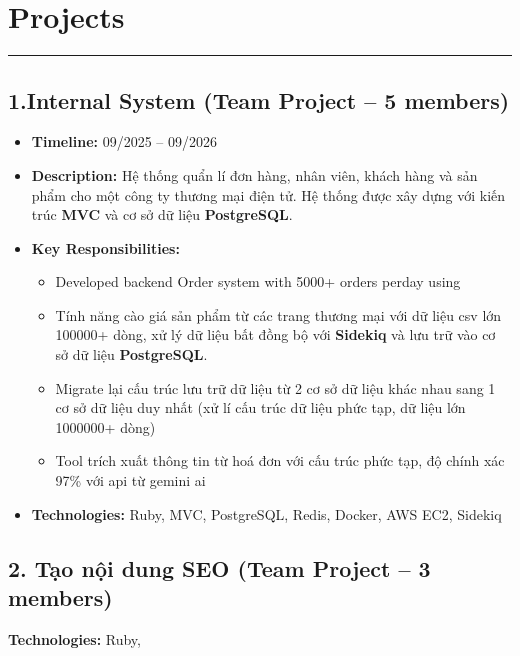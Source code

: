 \documentclass[a4paper,10pt]{article}
\begin{document}
\section{Projects}
\vspace{-10pt}
\noindent\rule{\linewidth}{0.5pt}

\subsection*{1.Internal System \hfill \small (Team Project – 5 members)}
\begin{itemize}
    \item \textbf{Timeline:} 09/2025 – 09/2026
    \item \textbf{Description:} Hệ thống quẩn lí đơn hàng, nhân viên, khách hàng và sản phẩm cho một công ty thương mại điện tử. Hệ thống được xây dựng với kiến trúc \textbf{MVC} và cơ sở dữ liệu \textbf{PostgreSQL}.
    \item \textbf{Key Responsibilities:}
    \begin{itemize}
        \item Developed backend Order system with 5000+ orders perday using 
        \item Tính năng cào giá sản phẩm từ các trang thương mại với dữ liệu csv lớn 100000+ dòng, xử lý dữ liệu bất đồng bộ với \textbf{Sidekiq} và lưu trữ vào cơ sở dữ liệu \textbf{PostgreSQL}.
        \item Migrate lại cấu trúc lưu trữ dữ liệu từ 2 cơ sở dữ liệu khác nhau sang 1 cơ sở dữ liệu duy nhất (xử lí cấu trúc dữ liệu phức tạp, dữ liệu lớn 1000000+ dòng)
        \item Tool trích xuất thông tin từ hoá đơn với cấu trúc phức tạp, độ chính xác 97\% với api từ gemini ai
    \end{itemize}
    \item \textbf{Technologies:} Ruby, MVC, PostgreSQL, Redis, Docker, AWS EC2, Sidekiq
\end{itemize}

\subsection*{2. Tạo nội dung SEO \hfill \small (Team Project – 3 members)}
    \item \textbf{Technologies:} Ruby, 
\end{document}
